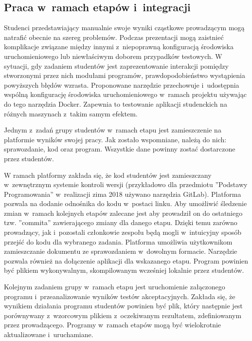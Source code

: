 \subsection{Praca w~ramach etapów i~integracji}
\label{work_in_stages_and_integrations}


Studenci przedstawiający manualnie swoje wyniki cząstkowe prowadzącym mogą natrafić obecnie na szereg problemów.
Podczas prezentacji mogą zaistnieć komplikacje związane między innymi z~niepoprawną konfiguracją środowiska uruchomieniowego lub niewłaściwym doborem przypadków testowych.
W sytuacji, gdy zadaniem studentów jest zaprezentowanie interakcji pomiędzy stworzonymi przez nich modułami programów, prawdopodobieństwo wystąpienia powyższych błędów wzrasta.
Proponowane narzędzie przechowuje i~udostępnia wspólną konfigurację środowiska uruchomieniowego w~ramach projektu używając do tego narzędzia Docker.
Zapewnia to testowanie aplikacji studenckich na różnych maszynach z~takim samym efektem.

Jednym z~zadań grupy studentów w~ramach etapu jest zamieszczenie na platformie wyników swojej pracy.
Jak zostało wspomniane, należą do nich: sprawozdanie, kod oraz program.
Wszystkie dane powinny zostać dostarczone przez studentów.

W ramach platformy zakłada się, że kod studentów jest zamieszczany w~zewnętrznym systemie kontroli wersji (przykładowo dla przedmiotu ”Podstawy Programowania” w~realizacji zima 2018 używano narzędzia GitLab).
Platforma pozwala na dodanie odnośnika do kodu w~postaci linku.
Aby umożliwić śledzenie zmian w~ramach kolejnych etapów zalecane jest aby prowadził on do ostatniego tzw. ”commita” zawierającego zmiany dla danego etapu.
Dzięki temu zarówno prowadzący, jak i~pozostali członkowie zespołu będą mogli w~intuicyjny sposób przejść do kodu dla wybranego zadania.
Platforma umożliwia użytkownikom zamieszczanie dokumentu ze sprawozdaniem w~dowolnym formacie.
Narzędzie pozwala również na dołączenie aplikacji dla wskazanego etapu.
Program powinien być plikiem wykonywalnym, skompilowanym wcześniej lokalnie przez studentów.

Kolejnym zadaniem grupy w~ramach etapu jest uruchomienie załączonego programu i~przeanalizowanie wyników testów akceptacyjnych.
Zakłada się, że wynikiem działania programu studentów powinien być plik, który następnie jest porównywany z~wzorcowym plikiem z~oczekiwanym rezultatem, zdefiniowanym przez prowadzącego.
Programy w~ramach etapów mogą być wielokrotnie aktualizowane i~uruchamiane.


